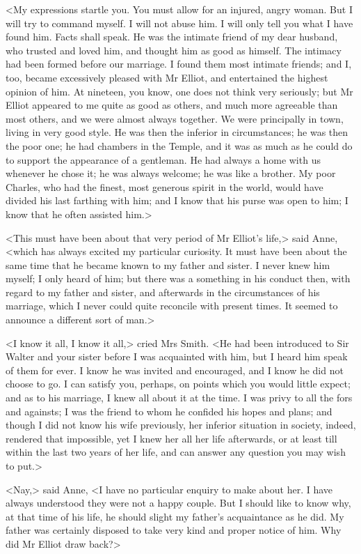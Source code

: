 <My expressions startle you. You must allow for an injured, angry woman. But I will try to command myself. I will not abuse him. I will only tell you what I have found him. Facts shall speak. He was the intimate friend of my dear husband, who trusted and loved him, and thought him as good as himself. The intimacy had been formed before our marriage. I found them most intimate friends; and I, too, became excessively pleased with Mr Elliot, and entertained the highest opinion of him. At nineteen, you know, one does not think very seriously; but Mr Elliot appeared to me quite as good as others, and much more agreeable than most others, and we were almost always together. We were principally in town, living in very good style. He was then the inferior in circumstances; he was then the poor one; he had chambers in the Temple, and it was as much as he could do to support the appearance of a gentleman. He had always a home with us whenever he chose it; he was always welcome; he was like a brother. My poor Charles, who had the finest, most generous spirit in the world, would have divided his last farthing with him; and I know that his purse was open to him; I know that he often assisted him.>

<This must have been about that very period of Mr Elliot's life,> said Anne, <which has always excited my particular curiosity. It must have been about the same time that he became known to my father and sister. I never knew him myself; I only heard of him; but there was a something in his conduct then, with regard to my father and sister, and afterwards in the circumstances of his marriage, which I never could quite reconcile with present times. It seemed to announce a different sort of man.>

<I know it all, I know it all,> cried Mrs Smith. <He had been introduced to Sir Walter and your sister before I was acquainted with him, but I heard him speak of them for ever. I know he was invited and encouraged, and I know he did not choose to go. I can satisfy you, perhaps, on points which you would little expect; and as to his marriage, I knew all about it at the time. I was privy to all the fors and againsts; I was the friend to whom he confided his hopes and plans; and though I did not know his wife previously, her inferior situation in society, indeed, rendered that impossible, yet I knew her all her life afterwards, or at least till within the last two years of her life, and can answer any question you may wish to put.>

<Nay,> said Anne, <I have no particular enquiry to make about her. I have always understood they were not a happy couple. But I should like to know why, at that time of his life, he should slight my father's acquaintance as he did. My father was certainly disposed to take very kind and proper notice of him. Why did Mr Elliot draw back?>

